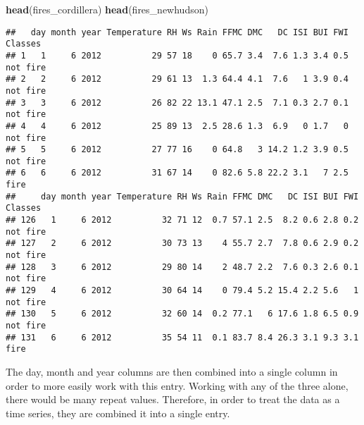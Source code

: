 \documentclass[
]{article}
\newenvironment{Shaded}{\begin{snugshade}}{\end{snugshade}}
\newcommand{\AttributeTok}[1]{\textcolor[rgb]{0.13,0.29,0.53}{#1}}
\newcommand{\FunctionTok}[1]{\textcolor[rgb]{0.13,0.29,0.53}{\textbf{#1}}}
\newcommand{\NormalTok}[1]{#1}
\newcommand{\OtherTok}[1]{\textcolor[rgb]{0.56,0.35,0.01}{#1}}
\newcommand{\SpecialCharTok}[1]{\textcolor[rgb]{0.81,0.36,0.00}{\textbf{#1}}}
\newcommand{\StringTok}[1]{\textcolor[rgb]{0.31,0.60,0.02}{#1}}
\begin{document}
\begin{Shaded}
\begin{Highlighting}[]
\FunctionTok{head}\NormalTok{(fires\_cordillera)}
\FunctionTok{head}\NormalTok{(fires\_newhudson)}
\end{Highlighting}
\end{Shaded}

\begin{verbatim}
##   day month year Temperature RH Ws Rain FFMC DMC   DC ISI BUI FWI     Classes
## 1   1     6 2012          29 57 18    0 65.7 3.4  7.6 1.3 3.4 0.5 not fire   
## 2   2     6 2012          29 61 13  1.3 64.4 4.1  7.6   1 3.9 0.4 not fire   
## 3   3     6 2012          26 82 22 13.1 47.1 2.5  7.1 0.3 2.7 0.1 not fire   
## 4   4     6 2012          25 89 13  2.5 28.6 1.3  6.9   0 1.7   0 not fire   
## 5   5     6 2012          27 77 16    0 64.8   3 14.2 1.2 3.9 0.5 not fire   
## 6   6     6 2012          31 67 14    0 82.6 5.8 22.2 3.1   7 2.5     fire   
##     day month year Temperature RH Ws Rain FFMC DMC   DC ISI BUI FWI     Classes
## 126   1     6 2012          32 71 12  0.7 57.1 2.5  8.2 0.6 2.8 0.2 not fire   
## 127   2     6 2012          30 73 13    4 55.7 2.7  7.8 0.6 2.9 0.2 not fire   
## 128   3     6 2012          29 80 14    2 48.7 2.2  7.6 0.3 2.6 0.1 not fire   
## 129   4     6 2012          30 64 14    0 79.4 5.2 15.4 2.2 5.6   1 not fire   
## 130   5     6 2012          32 60 14  0.2 77.1   6 17.6 1.8 6.5 0.9 not fire   
## 131   6     6 2012          35 54 11  0.1 83.7 8.4 26.3 3.1 9.3 3.1     fire
\end{verbatim}

The day, month and year columns are then combined into a single column
in order to more easily work with this entry. Working with any of the
three alone, there would be many repeat values. Therefore, in order to
treat the data as a time series, they are combined it into a single
entry.

\begin{Shaded}
\end{Shaded}
\end{document}
